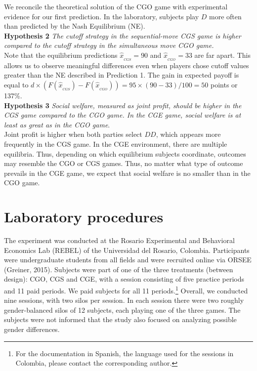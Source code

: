 \documentclass[12pt, letterpaper]{article}
\theoremstyle{plain}
\begin{document}
We reconcile the theoretical solution of the CGO game with experimental evidence for our first prediction. In the laboratory, subjects play $D$ more often than predicted by the Nash Equilibrium (NE). \\

\noindent \textbf{Hypothesis 2}
\textit{The cutoff strategy in the sequential-move CGS game is higher compared to the cutoff strategy in the simultaneous move CGO game.}\\

Note that the equilibrium predictions $\hat{x}_{_{CGS}}=90$ and $\hat{x}_{_{CGO}}=33$ are far apart. This allows us to observe meaningful differences even when players chose cutoff values greater than the NE described in Prediction 1. The gain in expected payoff is equal to $d\times \left( F(\hat{x}_{_{CGS}})-F(\hat{x}_{_{CGO}}) \right)=95\times( 90-33)/100=50$ points or 137\%. \\



\noindent \textbf{Hypothesis 3} \textit{Social welfare, measured as joint profit, should be higher in the CGS game compared to the CGO game. In the CGE game, social welfare is at least as great as in the CGO game}.\\

Joint profit is higher when both parties select $DD$, which appears more frequently in the CGS game. In the CGE environment, there are multiple equilibria. Thus, depending on which equilibrium subjects coordinate, outcomes may resemble the CGO or CGS games. Thus, no matter what type of outcome prevails in the CGE game, we expect that social welfare is no smaller than in the CGO game.\\

\section{Laboratory procedures}
\label{sec:game}

The experiment was conducted at the Rosario Experimental and Behavioral Economics Lab (REBEL) of the Universidad del Rosario, Colombia. Participants were undergraduate students from all fields and were recruited online via ORSEE (Greiner, 2015). Subjects were part of one of the three treatments (between design): CGO, CGS and CGE,  with a session consisting of five practice periods and 11 paid periods. We paid subjects for all 11 periods.\footnote{For the documentation in Spanish, the language used for the sessions in Colombia, please contact the corresponding author.} Overall, we conducted nine sessions, with two silos per session. In each session there were two roughly gender-balanced silos of 12 subjects, each playing one of the three games. The subjects were not informed that the study also focused on analyzing possible gender differences.
\end{document}
